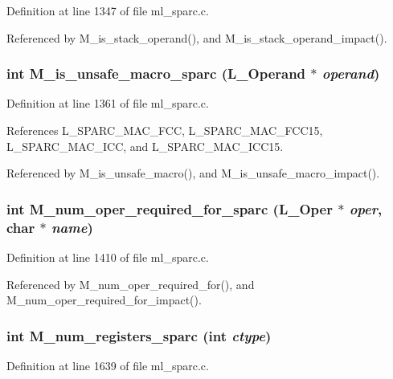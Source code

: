 Definition at line 1347 of file ml\_\-sparc.c.

Referenced by M\_\-is\_\-stack\_\-operand(), and M\_\-is\_\-stack\_\-operand\_\-impact().
\subsubsection{\setlength{\rightskip}{0pt plus 5cm}int M\_\-is\_\-unsafe\_\-macro\_\-sparc (L\_\-Operand $\ast$ {\em operand})}\label{ml__sparc_8c_b2f244b133c5cd2674cce2f51cd48875}




Definition at line 1361 of file ml\_\-sparc.c.

References L\_\-SPARC\_\-MAC\_\-FCC, L\_\-SPARC\_\-MAC\_\-FCC15, L\_\-SPARC\_\-MAC\_\-ICC, and L\_\-SPARC\_\-MAC\_\-ICC15.

Referenced by M\_\-is\_\-unsafe\_\-macro(), and M\_\-is\_\-unsafe\_\-macro\_\-impact().
\subsubsection{\setlength{\rightskip}{0pt plus 5cm}int M\_\-num\_\-oper\_\-required\_\-for\_\-sparc (L\_\-Oper $\ast$ {\em oper}, char $\ast$ {\em name})}\label{ml__sparc_8c_40f5e6281463d1d5d65447e60560d81a}




Definition at line 1410 of file ml\_\-sparc.c.

Referenced by M\_\-num\_\-oper\_\-required\_\-for(), and M\_\-num\_\-oper\_\-required\_\-for\_\-impact().
\subsubsection{\setlength{\rightskip}{0pt plus 5cm}int M\_\-num\_\-registers\_\-sparc (int {\em ctype})}\label{ml__sparc_8c_3ef9226a6ce2047330f0e5e3b2ce2665}




Definition at line 1639 of file ml\_\-sparc.c.

